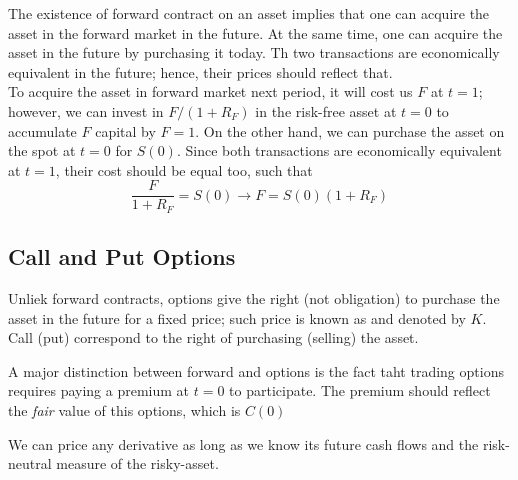 \documentclass{article}
\begin{document}
The existence of forward contract on an asset implies that one can acquire the asset in the forward market in the future. At the same time, one can acquire the asset in the future by purchasing it today. Th two transactions are economically equivalent in the future; hence, their prices should reflect that. \\ 

To acquire the asset in forward market next period, it will cost us $F$ at $t=1$; however, we can invest in $F/(1 + R_F)$ in the risk-free asset at $t=0$ to accumulate $F$ capital by $F=1$. On the other hand, we can purchase the asset on the spot at $t=0$ for $S(0)$. Since both transactions are economically equivalent at $t=1$, their cost should be equal too, such that $$\frac{F}{1 + R_F} = S(0) \rightarrow F = S(0)(1 + R_F)$$

\subsection{Call and Put Options}

Unliek forward contracts, options give the right (not obligation) to purchase the asset in the future for a fixed price; such price is known as  and denoted by $K$. Call (put) correspond to the right of purchasing (selling) the asset. 

\begin{remark}
  A major distinction between forward and options is the fact taht trading options requires paying a premium at $t=0$ to participate. The premium should reflect the \emph{fair} value of this options, which is $C(0)$
\end{remark}

We can price any derivative as long as we know its future cash flows and the risk-neutral measure of the risky-asset. 
\end{document}

